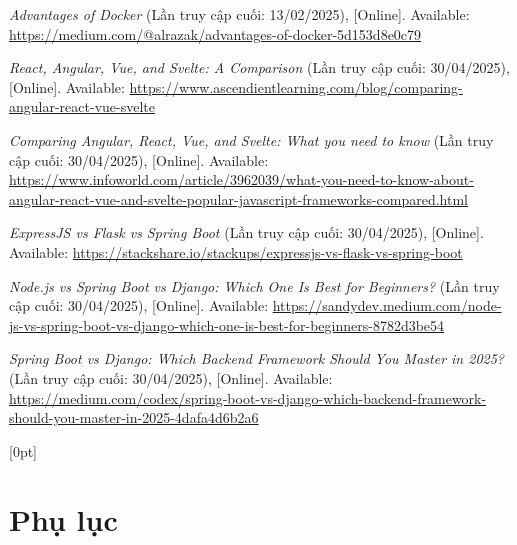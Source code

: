 \documentclass[12pt, a4paper]{article}
\begin{document}
\begin{thebibliography}{}
 \textit{Advantages of Docker} (Lần truy cập cuối: 13/02/2025), [Online]. Available: \url{https://medium.com/@alrazak/advantages-of-docker-5d153d8e0c79}

 \textit{React, Angular, Vue, and Svelte: A Comparison} (Lần truy cập cuối: 30/04/2025), [Online]. Available: \url{https://www.ascendientlearning.com/blog/comparing-angular-react-vue-svelte}

 \textit{Comparing Angular, React, Vue, and Svelte: What you need to know} (Lần truy cập cuối: 30/04/2025), [Online]. Available: \url{https://www.infoworld.com/article/3962039/what-you-need-to-know-about-angular-react-vue-and-svelte-popular-javascript-frameworks-compared.html}

 \textit{ExpressJS vs Flask vs Spring Boot} (Lần truy cập cuối: 30/04/2025), [Online]. Available: \url{https://stackshare.io/stackups/expressjs-vs-flask-vs-spring-boot}

 \textit{Node.js vs Spring Boot vs Django: Which One Is Best for Beginners?} (Lần truy cập cuối: 30/04/2025), [Online]. Available: \url{https://sandydev.medium.com/node-js-vs-spring-boot-vs-django-which-one-is-best-for-beginners-8782d3be54}

 \textit{Spring Boot vs Django: Which Backend Framework Should You Master in 2025?} (Lần truy cập cuối: 30/04/2025), [Online]. Available: \url{https://medium.com/codex/spring-boot-vs-django-which-backend-framework-should-you-master-in-2025-4dafa4d6b2a6}
\end{thebibliography}
\newpage
\appendix
\renewcommand{\thesection}{\arabic{section}} %
\titleformat{\section}{\normalfont\Large\bfseries}{\thesection}{1em}{} %
  [0pt]{\vspace{1ex}}{\bfseries \thecontentslabel \quad}{}
  {\hfill\bfseries\contentspage}
  
\section*{\centering \Large Phụ lục}

\end{document}
